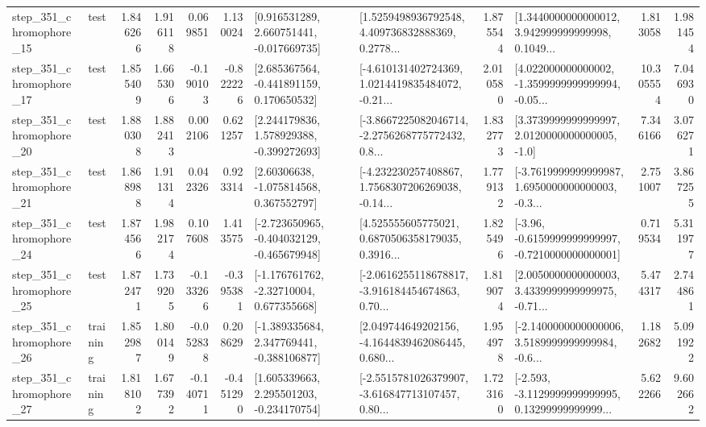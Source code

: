 \begin{tabular}{llrrrrllrlrr}
  step\_351\_chromophore\_15 &      test &      1.846266 &    1.916118 &      0.069851 &  1.130024 &    [0.916531289, 2.660751441, -0.017669735] &  [1.5259498936792548, 4.409736832888369, 0.2778... &       1.875544 &  [1.3440000000000012, 3.942999999999998, 0.1049... &            1.813058 &          1.981454 \\
  step\_351\_chromophore\_17 &      test &      1.855409 &    1.665306 &     -0.190103 & -0.822226 &    [2.685367564, -0.441891159, 0.170650532] &  [-4.610131402724369, 1.0214419835484072, -0.21... &       2.010580 &  [4.022000000000002, -1.3599999999999994, -0.05... &           10.305554 &          7.046930 \\
  step\_351\_chromophore\_20 &      test &      1.880308 &    1.882413 &      0.002106 &  0.621257 &    [2.244179836, 1.578929388, -0.399272693] &  [-3.8667225082046714, -2.2756268775772432, 0.8... &       1.832773 &     [3.3739999999999997, 2.0120000000000005, -1.0] &            7.346166 &          3.076271 \\
  step\_351\_chromophore\_21 &      test &      1.868988 &    1.911314 &      0.042326 &  0.923314 &     [2.60306638, -1.075814568, 0.367552797] &  [-4.232230257408867, 1.7568307206269038, -0.14... &       1.779132 &  [-3.7619999999999987, 1.6950000000000003, -0.3... &            2.751007 &          3.867255 \\
  step\_351\_chromophore\_24 &      test &      1.874566 &    1.982174 &      0.107608 &  1.413575 &  [-2.723650965, -0.404032129, -0.465679948] &  [4.525555605775021, 0.6870506358179035, 0.3916... &       1.825496 &  [-3.96, -0.6159999999999997, -0.7210000000000001] &            0.719534 &          5.311977 \\
  step\_351\_chromophore\_25 &      test &      1.872471 &    1.739205 &     -0.133266 & -0.395381 &    [-1.176761762, -2.32710004, 0.677355668] &  [-2.0616255118678817, -3.916184454674863, 0.70... &       1.819074 &  [2.0050000000000003, 3.4339999999999975, -0.71... &            5.474317 &          2.744861 \\
  step\_351\_chromophore\_26 &  training &      1.852987 &    1.800149 &     -0.052838 &  0.208629 &   [-1.389335684, 2.347769441, -0.388106877] &  [2.049744649202156, -4.1644839462086445, 0.680... &       1.954978 &  [-2.1400000000000006, 3.5189999999999984, -0.6... &            1.182682 &          5.091922 \\
  step\_351\_chromophore\_27 &  training &      1.818102 &    1.677392 &     -0.140711 & -0.451290 &    [1.605339663, 2.295501203, -0.234170754] &  [-2.5515781026379907, -3.616847713107457, 0.80... &       1.723160 &  [-2.593, -3.1129999999999995, 0.13299999999999... &            5.622266 &          9.602662 \\

\end{tabular}
